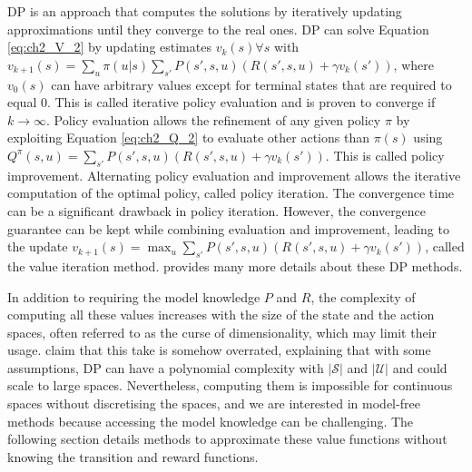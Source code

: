 DP is an approach that computes the solutions by iteratively updating approximations until they converge to the real ones.
DP can solve Equation \ref{eq:ch2_V_2} by updating estimates $v_k(s) \forall s$ with $v_{k+1}(s) = \sum_{u} \pi(u|s) \sum_{s'} P(s', s, u) (R(s', s, u) + \gamma v_k(s'))$, where $v_0(s)$ can have arbitrary values except for terminal states that are required to equal 0.
This is called iterative policy evaluation and is proven to converge if $k\rightarrow\infty$.
Policy evaluation allows the refinement of any given policy $\pi$ by exploiting Equation \ref{eq:ch2_Q_2} to evaluate other actions than $\pi(s)$ using $Q^\pi(s, u) =  \sum_{s'} P(s', s, u) (R(s', s, u) + \gamma v_k(s'))$. 
This is called policy improvement.
Alternating policy evaluation and improvement allows the iterative computation of the optimal policy, called policy iteration.
The convergence time can be a significant drawback in policy iteration.
However, the convergence guarantee can be kept while combining evaluation and improvement, leading to the update $v_{k+1}(s) = \max_u \sum_{s'} P(s', s, u) (R(s', s, u) + \gamma v_k(s'))$, called the value iteration method.
\cite{sutton2018reinforcement} provides many more details about these DP methods.

In addition to requiring the model knowledge $P$ and $R$, the complexity of computing all these values increases with the size of the state and the action spaces, often referred to as the curse of dimensionality, which may limit their usage.
\cite{sutton2018reinforcement} claim that this take is somehow overrated, explaining that with some assumptions, DP can have a polynomial complexity with $|\mathcal{S}|$ and $|\mathcal{U}|$ and could scale to large spaces.
Nevertheless, computing them is impossible for continuous spaces without discretising the spaces, and we are interested in model-free methods because accessing the model knowledge can be challenging.
The following section details methods to approximate these value functions without knowing the transition and reward functions.

